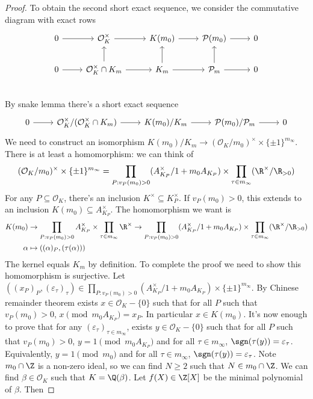 \documentclass[a4paper]{article}
\renewcommand*{\O}{\mathcal{O}}
\begin{document}
\begin{proof}
  To obtain the second short exact sequence, we consider the commutative diagram with exact rows
  \[
    \begin{tikzcd}
      0 \ar[r] & \O_K^\times \ar[r] & K(m_0) \ar[r] & \mathcal P(m_0) \ar[r] & 0 \\
      0 \ar[r] & \O_K^\times \cap K_m \ar[r] \ar[u] & K_m \ar[u] \ar[r] & \mathcal P_m \ar[r] \ar[u] & 0 \\
    \end{tikzcd}
  \]
  By snake lemma there's a short exact sequence
  \[
    \begin{tikzcd}
      0 \ar[r] & \O_K^\times/(\O_K^\times \cap K_m) \ar[r] & K(m_0)/K_m \ar[r] & \mathcal P(m_0)/\mathcal P_m \ar[r] & 0
    \end{tikzcd}
  \]
  We need to construct an isomorphism \(K(m_0)/K_m \to (\O_K/m_0)^\times \times \{\pm 1\}^{m_\infty}\). There is at least a homomorphism: we can think of
  \[
    (\O_K/m_0)^\times \times \{\pm 1\}^{m_\infty} = \prod_{P: v_P(m_0) > 0} (A_{K_P}^\times/1 + m_0 A_{K_P}) \times \prod_{\tau \in m_\infty} (\R^\times/\R_{> 0})
  \]
  For any \(P \subseteq \O_K\), there's an inclusion \(K^\times \subseteq K_P^\times\). If \(v_P(m_0) > 0\), this extends to an inclusion \(K(m_0) \subseteq A_{K_P}^\times\). The homomorphism we want is
  \begin{align*}
    K(m_0) &\to \prod_{P: v_P(m_0) > 0} A_{K_P}^\times \times \prod_{\tau \in m_\infty} \R^\times \to \prod_{P: v_P(m_0) > 0} (A_{K_P}^\times/1 + m_0 A_{K_P}) \times \prod_{\tau \in m_\infty} (\R^\times/\R_{> 0}) \\
    \alpha &\mapsto ((\alpha)_P, (\tau(\alpha)))
  \end{align*}
  The kernel equals \(K_m\) by definition. To complete the proof we need to show this homomorphism is surjective. Let \(((x_P)_P, (\varepsilon_\tau)_\tau) \in \prod_{P: v_P(m_0) > 0} (A_{K_P}^\times/1 + m_0 A_{K_P}) \times \{\pm 1\}^{m_\infty}\). By Chinese remainder theorem exists \(x \in \O_K - \{0\}\) such that for all \(P\) such that \(v_P(m_0) > 0\), \(x \pmod{m_0 A_{K_P}} = x_P\). In particular \(x \in K(m_0)\). It's now enough to prove that for any \((\varepsilon_\tau)_{\tau \in m_\infty}\), exists \(y \in \O_K - \{0\}\) such that for all \(P\) such that \(v_P(m_0) > 0\), \(y = 1 \pmod{m_0 A_{K_P}}\) and for all \(\tau \in m_\infty\), \(\sgn(\tau(y)) = \varepsilon_\tau\). Equivalently, \(y = 1 \pmod{m_0}\) and for all \(\tau \in m_\infty\), \(\sgn(\tau(y)) = \varepsilon_\tau\). Note \(m_0 \cap \Z\) is a non-zero ideal, so we can find \(N \geq 2\) such that \(N \in m_0 \cap \Z\). We can find \(\beta \in \O_K\) such that \(K = \Q(\beta)\). Let \(f(X) \in \Z[X]\) be the minimal polynomial of \(\beta\). Then

\end{proof}
\end{document}
